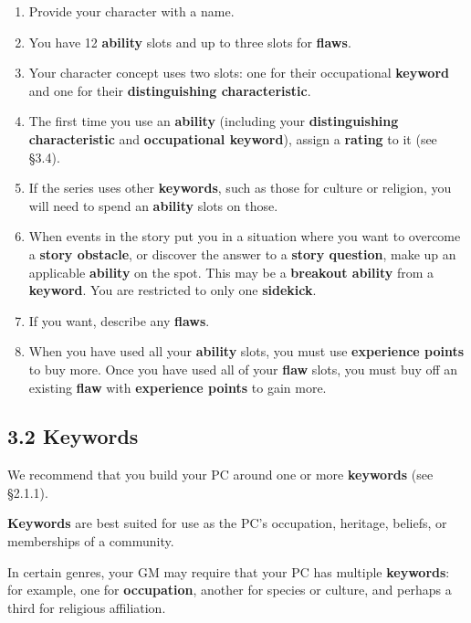 \documentclass[
  11pt,
]{article}
\providecommand{\tightlist}{%
  \setlength{\itemsep}{0pt}\setlength{\parskip}{0pt}}
\begin{document}
\begin{enumerate}
\def\labelenumi{\arabic{enumi}.}
\setcounter{enumi}{1}
\tightlist
\item
  Provide your character with a name.
\item
  You have 12 \textbf{ability} slots and up to three slots for
  \textbf{flaws}.
\item
  Your character concept uses two slots: one for their occupational
  \textbf{keyword} and one for their \textbf{distinguishing
  characteristic}.
\item
  The first time you use an \textbf{ability} (including your
  \textbf{distinguishing characteristic} and \textbf{occupational
  keyword}), assign a \textbf{rating} to it (see §3.4).
\item
  If the series uses other \textbf{keywords}, such as those for culture
  or religion, you will need to spend an \textbf{ability} slots on
  those.
\item
  When events in the story put you in a situation where you want to
  overcome a \textbf{story obstacle}, or discover the answer to a
  \textbf{story question}, make up an applicable \textbf{ability} on the
  spot. This may be a \textbf{breakout ability} from a \textbf{keyword}.
  You are restricted to only one \textbf{sidekick}.
\item
  If you want, describe any \textbf{flaws}.
\item
  When you have used all your \textbf{ability} slots, you must use
  \textbf{experience points} to buy more. Once you have used all of your
  \textbf{flaw} slots, you must buy off an existing \textbf{flaw} with
  \textbf{experience points} to gain more.
\end{enumerate}

\hypertarget{keywords-1}{%
\subsection{3.2 Keywords}\label{keywords-1}}

We recommend that you build your PC around one or more \textbf{keywords}
(see §2.1.1).

\textbf{Keywords} are best suited for use as the PC's occupation,
heritage, beliefs, or memberships of a community.

In certain genres, your GM may require that your PC has multiple
\textbf{keywords}: for example, one for \textbf{occupation}, another for
species or culture, and perhaps a third for religious affiliation.
\end{document}
